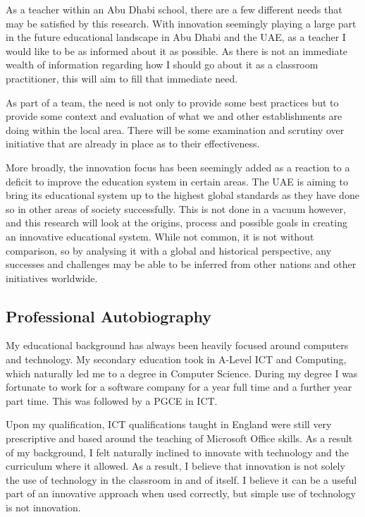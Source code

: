 \documentclass[11pt]{article}
\begin{document}
As a teacher within an Abu Dhabi school, there are a few different needs that may be satisfied by this research. With innovation seemingly playing a large part in the future educational landscape in Abu Dhabi and the UAE, as a teacher I would like to be as informed about it as possible. As there is not an immediate wealth of information regarding how I should go about it as a classroom practitioner, this will aim to fill that immediate need.

As part of a team, the need is not only to provide some best practices but to provide some context and evaluation of what we and other establishments are doing within the local area. There will be some examination and scrutiny over initiative that are already in place as to their effectiveness.

More broadly, the innovation focus has been seemingly added as a reaction to a deficit to improve the education system in certain areas. The UAE is aiming to bring its educational system up to the highest global standards as they have done so in other areas of society successfully. This is not done in a vacuum however, and this research will look at the origins, process and possible goals in creating an innovative educational system. While not common, it is not without comparison, so by analysing it with a global and historical perspective, any successes and challenges may be able to be inferred from other nations and other initiatives worldwide.


\subsection{Professional Autobiography}
My educational background has always been heavily focused around computers and technology. My secondary education took in A-Level ICT and Computing, which naturally led me to a degree in Computer Science. During my degree I was fortunate to work for a software company for a year full time and a further year part time. This was followed by a PGCE in ICT.

Upon my qualification, ICT qualifications taught in England were still very prescriptive and based around the teaching of Microsoft Office skills. As a result of my background, I felt naturally inclined to innovate with technology and the curriculum where it allowed. As a result, I believe that innovation is not solely the use of technology in the classroom in and of itself. I believe it can be a useful part of an innovative approach when used correctly, but simple use of technology is not innovation. 
\end{document}
